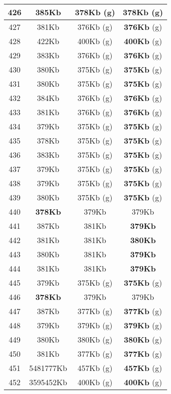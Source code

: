 \begin{table}[H]
\begin{minipage}{5cm}
{\begin{tabular}{|c|c|c|c|}
\hline
426 & 385Kb & 378Kb (g) & \textbf{378Kb} (g) \\
\hline
427 & 381Kb & 376Kb (g) & \textbf{376Kb} (g) \\
\hline
428 & 422Kb & 400Kb (g) & \textbf{400Kb} (g) \\
\hline
429 & 383Kb & 376Kb (g) & \textbf{376Kb} (g) \\
\hline
430 & 380Kb & 375Kb (g) & \textbf{375Kb} (g) \\
\hline
431 & 380Kb & 375Kb (g) & \textbf{375Kb} (g) \\
\hline
432 & 384Kb & 376Kb (g) & \textbf{376Kb} (g) \\
\hline
433 & 381Kb & 376Kb (g) & \textbf{376Kb} (g) \\
\hline
434 & 379Kb & 375Kb (g) & \textbf{375Kb} (g) \\
\hline
435 & 378Kb & 375Kb (g) & \textbf{375Kb} (g) \\
\hline
436 & 383Kb & 375Kb (g) & \textbf{375Kb} (g) \\
\hline
437 & 379Kb & 375Kb (g) & \textbf{375Kb} (g) \\
\hline
438 & 379Kb & 375Kb (g) & \textbf{375Kb} (g) \\
\hline
439 & 380Kb & 375Kb (g) & \textbf{375Kb} (g) \\
\hline
440 & \textbf{378Kb} & 379Kb & 379Kb \\
\hline
441 & 387Kb & 381Kb & \textbf{379Kb} \\
\hline
442 & 381Kb & 381Kb & \textbf{380Kb} \\
\hline
443 & 380Kb & 381Kb & \textbf{379Kb} \\
\hline
444 & 381Kb & 381Kb & \textbf{379Kb} \\
\hline
445 & 379Kb & 375Kb (g) & \textbf{375Kb} (g) \\
\hline
446 & \textbf{378Kb} & 379Kb & 379Kb \\
\hline
447 & 387Kb & 377Kb (g) & \textbf{377Kb} (g) \\
\hline
448 & 379Kb & 379Kb (g) & \textbf{379Kb} (g) \\
\hline
449 & 380Kb & 380Kb (g) & \textbf{380Kb} (g) \\
\hline
450 & 381Kb & 377Kb (g) & \textbf{377Kb} (g) \\
\hline
451 & 5481777Kb & 457Kb (g) & \textbf{457Kb} (g) \\
\hline
452 & 3595452Kb & 400Kb (g) & \textbf{400Kb} (g) \\
\hline
\end{tabular}
}
\end{minipage}

\end{table}
